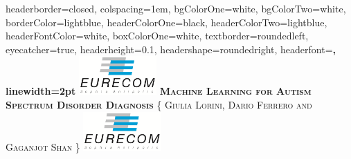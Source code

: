 \documentclass[landscape,a0paper,fontscale=0.285]{baposter} %
\begin{document}
\begin{poster}
{
headerborder=closed, %
colspacing=1em, %
bgColorOne=white, %
bgColorTwo=white, %
borderColor=lightblue, %
headerColorOne=black, %
headerColorTwo=lightblue, %
headerFontColor=white, %
boxColorOne=white, %
textborder=roundedleft, %
eyecatcher=true, %
headerheight=0.1\textheight, %
headershape=roundedright, %
headerfont=\Large\bf\textsc, %
linewidth=2pt %
}
%
{\includegraphics[height=4em]{logo.png}} %
{\bf\textsc{Machine Learning for Autism Spectrum Disorder Diagnosis}\vspace{0.5em}} %
{\textsc{\{ Giulia Lorini, Dario Ferrero and Gaganjot Shan \} \hspace{12pt} }} %
{\includegraphics[height=4em]{logo.png}} %



\end{poster}
\end{document}
